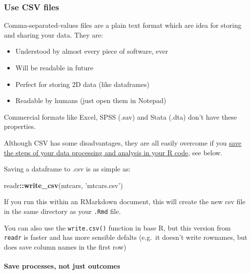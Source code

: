 \documentclass[]{article}
\newenvironment{Shaded}{\begin{snugshade}}{\end{snugshade}}
\newcommand{\KeywordTok}[1]{\textcolor[rgb]{0.13,0.29,0.53}{\textbf{#1}}}
\newcommand{\StringTok}[1]{\textcolor[rgb]{0.31,0.60,0.02}{#1}}
\newcommand{\OperatorTok}[1]{\textcolor[rgb]{0.81,0.36,0.00}{\textbf{#1}}}
\newcommand{\NormalTok}[1]{#1}
\providecommand{\tightlist}{%
  \setlength{\itemsep}{0pt}\setlength{\parskip}{0pt}}
\let\oldparagraph\paragraph
\renewcommand{\paragraph}[1]{\oldparagraph{#1}\mbox{}}
\theoremstyle{definition}
\theoremstyle{definition}
\theoremstyle{definition}
\theoremstyle{remark}
\begin{document}
\hypertarget{use-csv}{\subsubsection*{Use CSV files}\label{use-csv}}

Comma-separated-values files are a plain text format which are idea for
storing and sharing your data. They are:

\begin{itemize}
\tightlist
\item
  Understood by almost every piece of software, ever
\item
  Will be readable in future
\item
  Perfect for storing 2D data (like dataframes)
\item
  Readable by humans (just open them in Notepad)
\end{itemize}

Commercial formats like Excel, SPSS (.sav) and Stata (.dta) don't have
these properties.

Although CSV has some disadvantages, they are all easily overcome if you
\protect\hyperlink{save-intermediate-steps}{save the steps of your data
processing and analysis in your R code}, see below.

Saving a dataframe to .csv is as simple as:

\begin{Shaded}
\begin{Highlighting}[]
\NormalTok{readr}\OperatorTok{::}\KeywordTok{write_csv}\NormalTok{(mtcars, }\StringTok{'mtcars.csv'}\NormalTok{)}
\end{Highlighting}
\end{Shaded}

If you run this within an RMarkdown document, this will create the new
csv file in the same directory as your \texttt{.Rmd} file.

{You can also use the \texttt{write.csv()} function in base R, but this
version from \texttt{readr} is faster and has more sensible defalts
(e.g.~it doesn't write rownames, but does save column names in the first
row)}

\hypertarget{save-intermediate-steps}{\paragraph{Save processes, not
just outcomes}\label{save-intermediate-steps}}
\end{document}
